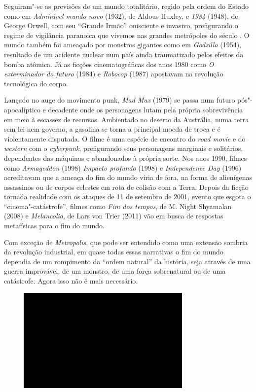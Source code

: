 Seguiram"-se as previsões
de um mundo totalitário, regido pela ordem do Estado como em
\emph{Admirável mundo novo} (1932), de Aldous Huxley, e \emph{1984} (1948), de George Orwell, com seu
``Grande Irmão'' onisciente e invasivo, prefigurando o regime de
vigilância paranoica que vivemos nas grandes metrópoles do século . O
mundo também foi ameaçado por monstros gigantes como em \emph{Godzilla} (1954),
resultado de um acidente nuclear num país ainda traumatizado pelos
efeitos da bomba atômica. Já as ficções cinematográficas dos anos 1980
como \emph{O exterminador do futuro} (1984) e \emph{Robocop} (1987)
apostavam na revolução tecnológica do corpo.

Lançado no auge do movimento punk, \emph{Mad Max} (1979) se passa num
futuro pós"-apocalíptico e decadente onde os personagens lutam pela
própria sobrevivência em meio à escassez de recursos. Ambientado no
deserto da Austrália, numa terra sem lei nem governo, a gasolina se
torna a principal moeda de troca e é violentamente disputada. O filme é
uma espécie de encontro do \emph{road movie} e do \emph{western} com o
\emph{cyberpunk}, prefigurando seus personagens marginais e solitários,
dependentes das máquinas e abandonados à própria sorte. Nos anos 1990,
filmes como \emph{Armageddon} (1998) \emph{Impacto profundo}
(1998) e \emph{Independence Day} (1996) acreditavam que a ameaça do fim
do mundo viria de fora, na forma de alienígenas assassinos ou de corpos
celestes em rota de colisão com a Terra. Depois da ficção tornada
realidade com os ataques de 11 de setembro de 2001, evento que esgota o
``cinema"-catástrofe'', filmes como \emph{Fim dos tempos}, de M. Night
Shyamalan (2008) e \emph{Melancolia}, de Lars von Trier (2011) vão em
busca de respostas metafísicas para o fim do mundo.

Com exceção de \emph{Metropolis}, que pode ser entendido como uma
extensão sombria da revolução industrial, em quase todas essas
narrativas o fim do mundo dependia de um rompimento da ``ordem natural''
da história, seja através de uma guerra improvável, de um monstro, de uma força sobrenatural ou de uma catástrofe. Agora isso não é mais necessário.

\begin{figure}[!ht]

\centering
 \includegraphics[width=85mm]{./imgs/im1.jpg}
\caption{\tiny{}}

\end{figure}

